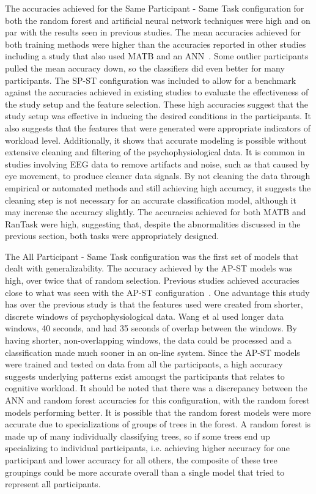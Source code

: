\documentclass[11pt]{article}
\begin{document}
	The accuracies achieved for the Same Participant - Same Task configuration for both the random forest and artificial neural network techniques were high and on par with the results seen in previous studies. The mean accuracies achieved for both training methods were higher than the accuracies reported in other studies~\cite{Zhang, Yin} including a study that also used MATB and an ANN~\cite{Wilson_2003}. Some outlier participants pulled the mean accuracy down, so the classifiers did even better for many participants. The SP-ST configuration was included to allow for a benchmark against the accuracies achieved in existing studies to evaluate the effectiveness of the study setup and the feature selection. These high accuracies suggest that the study setup was effective in inducing the desired conditions in the participants. It also suggests that the features that were generated were appropriate indicators of workload level. Additionally, it shows that accurate modeling is possible without extensive cleaning and filtering of the psychophysiological data. It is common in studies involving EEG data to remove artifacts and noise, such as that caused by eye movement, to produce cleaner data signals. By not cleaning the data through empirical or automated methods and still achieving high accuracy, it suggests the cleaning step is not necessary for an accurate classification model, although it may increase the accuracy slightly. The accuracies achieved for both MATB and RanTask were high, suggesting that, despite the abnormalities discussed in the previous section, both tasks were appropriately designed.
	
	The All Participant - Same Task configuration was the first set of models that dealt with generalizability. The accuracy achieved by the AP-ST models was high, over twice that of random selection. Previous studies achieved accuracies close to what was seen with the AP-ST configuration~\cite{Wang_Z}. One advantage this study has over the previous study is that the features used were created from shorter, discrete windows of psychophysiological data. Wang et al used longer data windows, 40 seconds, and had 35 seconds of overlap between the windows. By having shorter, non-overlapping windows, the data could be processed and a classification made much sooner in an on-line system. Since the AP-ST models were trained and tested on data from all the participants, a high accuracy suggests underlying patterns exist amongst the participants that relates to cognitive workload. It should be noted that there was a discrepancy between the ANN and random forest accuracies for this configuration, with the random forest models performing better. It is possible that the random forest models were more accurate due to specializations of groups of trees in the forest. A random forest is made up of many individually classifying trees, so if some trees end up specializing to individual participants, i.e. achieving higher accuracy for one participant and lower accuracy for all others, the composite of these tree groupings could be more accurate overall than a single model that tried to represent all participants. 
	
\end{document}
